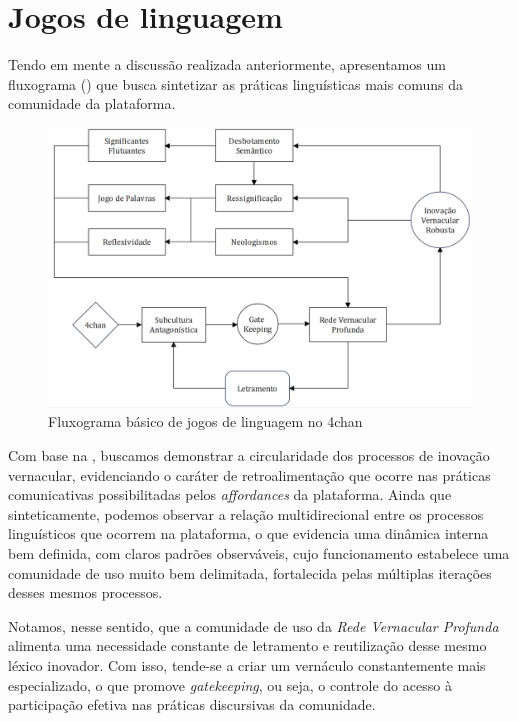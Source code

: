 \documentclass[portuguese]{textolivre}
\begin{document}
\section{Jogos de linguagem}

Tendo em mente a discussão realizada anteriormente, apresentamos um fluxograma () que busca sintetizar as práticas linguísticas mais comuns da comunidade da plataforma.

\begin{figure}[h!]
\centering
\begin{minipage}{.8\textwidth}
 \includegraphics[width=\textwidth]{image4.png}
 \caption{Fluxograma básico de jogos de linguagem no 4chan}
 \label{fig4}
\end{minipage}
\end{figure}

Com base na , buscamos demonstrar a circularidade dos processos de inovação vernacular, evidenciando o caráter de retroalimentação que ocorre nas práticas comunicativas possibilitadas pelos \emph{affordances} da plataforma. Ainda que sinteticamente, podemos observar a relação multidirecional entre os processos linguísticos que ocorrem na plataforma, o que evidencia uma dinâmica interna bem definida, com claros padrões observáveis, cujo funcionamento estabelece uma comunidade de uso muito bem delimitada, fortalecida pelas múltiplas iterações desses mesmos processos. 

Notamos, nesse sentido, que a comunidade de uso da \emph{Rede Vernacular Profunda} alimenta uma necessidade constante de letramento e reutilização desse mesmo léxico inovador. Com isso, tende-se a criar um vernáculo constantemente mais especializado, o que promove \emph{gatekeeping}, ou seja, o controle do acesso à participação efetiva nas práticas discursivas da comunidade.
\end{document}
